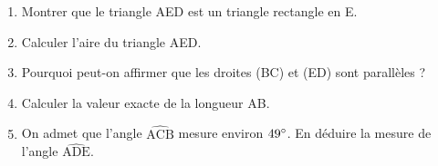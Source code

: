\documentclass[exercice,a4]{thedocument}%
\begin{document}
\begin{enumerate}
\item Montrer que le triangle AED est un triangle rectangle en E.
\item Calculer l'aire du triangle AED.
\item Pourquoi peut-on affirmer que les droites (BC) et (ED) sont parallèles ?
\item Calculer la valeur exacte de la longueur AB.
\item On admet que l'angle $\widehat{\text{ACB}}$ mesure environ $49^\circ$. En déduire la mesure de l'angle $\widehat{\text{ADE}}$.
\end{enumerate}

\newpage

\medskip
\showthesource
\end{document}
